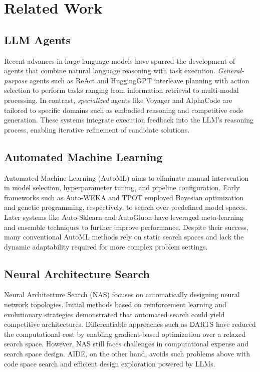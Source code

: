 \section{Related Work}
\subsection{LLM Agents}
Recent advances in large language models have spurred the development of agents that combine natural language reasoning with task execution. \emph{General-purpose} agents such as ReAct \citep{Yao2023} and HuggingGPT \citep{Shen2023} interleave planning with action selection to perform tasks ranging from information retrieval to multi-modal processing. In contrast, \emph{specialized} agents like Voyager \citep{voyager} and AlphaCode \citep{alphacode} are tailored to specific domains such as embodied reasoning and competitive code generation. These systems integrate execution feedback into the LLM's reasoning process, enabling iterative refinement of candidate solutions.

\subsection{Automated Machine Learning}
Automated Machine Learning (AutoML) aims to eliminate manual intervention in model selection, hyperparameter tuning, and pipeline configuration. Early frameworks such as Auto-WEKA \citep{autoweka-kdd} and TPOT \citep{tpot} employed Bayesian optimization and genetic programming, respectively, to search over predefined model spaces. Later systems like Auto-Sklearn \citep{autosklearn} and AutoGluon \citep{autogluon} have leveraged meta-learning and ensemble techniques to further improve performance. Despite their success, many conventional AutoML methods rely on static search spaces and lack the dynamic adaptability required for more complex problem settings.

\subsection{Neural Architecture Search}
Neural Architecture Search (NAS) focuses on automatically designing neural network topologies. Initial methods based on reinforcement learning \citep{Zoph2017} and evolutionary strategies \citep{Real2019} demonstrated that automated search could yield competitive architectures. Differentiable approaches such as DARTS \citep{Liu2019} have reduced the computational cost by enabling gradient-based optimization over a relaxed search space. However, NAS still faces challenges in computational expense and search space design. 
AIDE, on the other hand, avoids such problems above with code space search and efficient design exploration powered by LLMs.